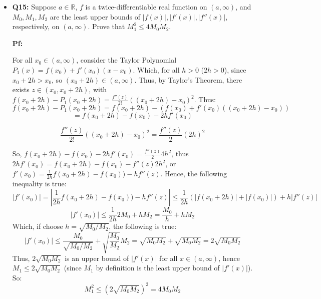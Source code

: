 \documentclass{article}
\begin{document}
\begin{itemize}
    \hfill

    \item \begin{myBox}[]{}
        \textbf{Q15:} Suppose $a\in\mathbb{R}$, $f$ is a twice-differentiable real function on $(a,\infty)$, and $M_0,M_1,M_2$ are the least upper bounds of $|f(x)|,|f'(x)|,|f''(x)|$, respectively, on $(a,\infty)$. 
        Prove that $M_1^2\leq 4M_0M_2$.
    \end{myBox}

    \textbf{Pf:}

    For all $x_0\in (a,\infty)$, consider the Taylor Polynomial $P_1(x)=f(x_0)+f'(x_0)(x-x_0)$. Which, for all $h>0$ ($2h>0$), since $x_0+2h>x_0$, so $(x_0+2h)\in (a,\infty)$. 
    Thus, by Taylor's Theorem, there exists $z\in (x_0,x_0+2h)$, with $f(x_0+2h)-P_1(x_0+2h)=\frac{f''(z)}{2!}((x_0+2h)-x_0)^2$. Thus:
    $$f(x_0+2h)-P_1(x_0+2h)=f(x_0+2h)-\left(f(x_0)+f'(x_0)((x_0+2h)-x_0)\right)$$
    $$=f(x_0+2h)-f(x_0)-2hf'(x_0)$$

    $$\frac{f''(z)}{2!}((x_0+2h)-x_0)^2 = \frac{f''(z)}{2}(2h)^2$$

    So, $f(x_0+2h)-f(x_0)-2hf'(x_0)=\frac{f''(z)}{2}4h^2$, thus $2hf'(x_0)=f(x_0+2h)-f(x_0)-f''(z)2h^2$, or $f'(x_0)=\frac{1}{2h}f(x_0+2h)-f(x_0))-hf''(z)$. Hence, the following inequality is true:
    $$|f'(x_0)| = \left|\frac{1}{2h}f(x_0+2h)-f(x_0))-hf''(z)\right| \leq \frac{1}{2h}(|f(x_0+2h)|+|f(x_0)|) + h|f''(z)|$$
    $$|f'(x_0)| \leq \frac{1}{2h}2M_0 + hM_2 = \frac{M_0}{h}+hM_2$$
    Which, if choose $h=\sqrt{M_0/M_2}$, the following is true:
    $$|f'(x_0)| \leq \frac{M_0}{\sqrt{M_0/M_2}}+\sqrt{\frac{M_0}{M_2}}M_2 = \sqrt{M_0M_2}+\sqrt{M_0M_2}=2\sqrt{M_0M_2}$$
    Thus, $2\sqrt{M_0M_2}$ is an upper bound of $|f'(x)|$ for all $x\in(a,\infty)$, hence $M_1\leq 2\sqrt{M_0M_2}$ (since $M_1$ by definition is the least upper bound of $|f'(x)|$). So:
    $$M_1^2 \leq (2\sqrt{M_0M_2})^2 = 4M_0M_2$$


\end{itemize}
\end{document}
